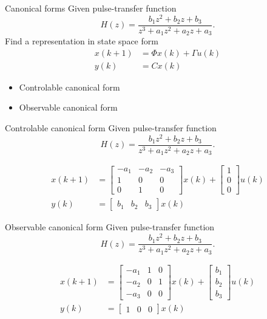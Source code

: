 \documentclass[presentation,aspectratio=1610]{beamer}
\begin{document}
\begin{frame}[label={sec:orga09dbeb}]{Canonical forms}
Given pulse-transfer function 
\[ H(z) = \frac{b_1 z^2 + b_2 z + b_3}{z^3 + a_1z^2 + a_2z + a_3}.\] 
Find a representation in state space form
\begin{align*}
 x(k+1) &= \Phi x(k) + \Gamma u(k) \\
 y(k) &= C x(k)
 \end{align*}

\pause

\begin{itemize}
\item Controlable canonical form
\item Observable canonical form
\end{itemize}
\end{frame}

\begin{frame}[label={sec:org8bf8145}]{Controlable canonical form}
Given pulse-transfer function 
\[ H(z) = \frac{b_1 z^2 + b_2 z + b_3}{z^3 + a_1z^2 + a_2z + a_3}.\] 

\begin{align*}
 x(k+1) &= \begin{bmatrix} -a_1 & -a_2 & -a_3\\1 & 0 & 0\\0 & 1 & 0\end{bmatrix} x(k) + \begin{bmatrix}1\\0\\0\end{bmatrix} u(k) \\
 y(k) &= \begin{bmatrix} b_1 & b_2 & b_3 \end{bmatrix} x(k)
 \end{align*}
\end{frame}


\begin{frame}[label={sec:orga3d2da4}]{Observable canonical form}
Given pulse-transfer function 
\[ H(z) = \frac{b_1 z^2 + b_2 z + b_3}{z^3 + a_1z^2 + a_2z + a_3}.\] 

\begin{align*}
 x(k+1) &= \begin{bmatrix} -a_1 & 1 & 0\\-a_2 & 0 & 1\\-a_3 & 0 & 0\end{bmatrix} x(k) + \begin{bmatrix}b_1\\b_2\\b_3\end{bmatrix} u(k) \\
 y(k) &= \begin{bmatrix} 1 & 0 & 0 \end{bmatrix} x(k)
 \end{align*}
\end{frame}
\end{document}

